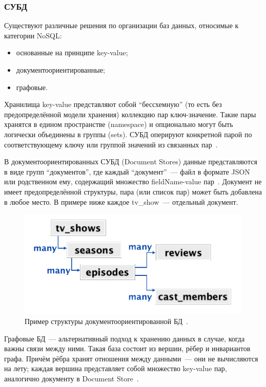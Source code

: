 \documentclass[14pt]{matmex-diploma-custom}
\begin{document}
\subsubsection{СУБД}
Существуют различные решения по организации баз данных, относимые к категории NoSQL:
\begin{itemize}
    \item основанные на принципе key-value;
    \item документоориентированные;
    \item графовые.
\end{itemize}
Хранилища key-value представляют собой ``бессхемную'' (то есть без предопределённой модели хранения) коллекцию пар ключ-значение. Такие пары хранятся в едином пространстве (namespace) и опционально могут быть логически объединены в группы (sets). СУБД оперируют конкретной парой по соответствующему ключу или группой значений из связанных пар~\cite{article:modelling}.

В документоориентированных СУБД (Document Stores) данные представляются в виде групп ``документов'', где каждый ``документ''~--- файл в формате JSON или родственном ему, содержащий множество fieldName-value пар~\cite{article:modelling}. Документ не имеет предопределённой структуры, пара (или список пар) может быть добавлена в любое место. В примере ниже каждое tv\_show~--- отдельный документ.

\begin{figure}[ht]
    \includegraphics[width=\textwidth]{mongo}
    \caption{Пример структуры документоориентированной БД~\cite{mongo:never}.}
\end{figure}

Графовые БД~--- альтернативный подход к хранению данных в случае, когда важны связи между ними. Такая база состоит из вершин, рёбер и инвариантов графа. Причём рёбра хранят отношения между данными~--- они не вычисляются на лету; каждая вершина представляет собой множество key-value пар, аналогично документу в Document Store~\cite{article:graph}.
\end{document}
